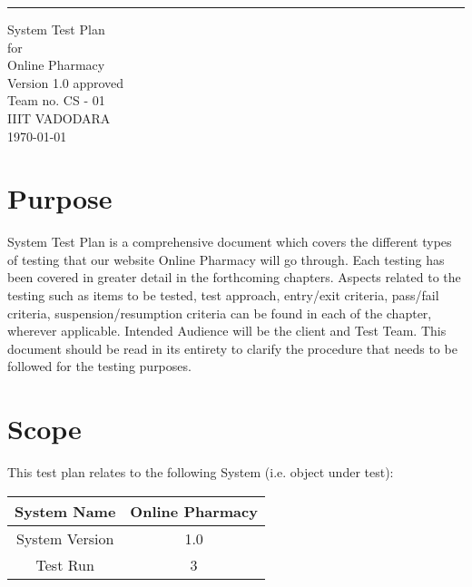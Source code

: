 \documentclass{article}
\date{}
\def\myversion{1.0 }
\begin{document}
\begin{center}
    \rule{16cm}{5pt}\vskip1cm
    \begin{bfseries}
        \Huge{System Test Plan}\\
        \vspace{1.9cm}
        for\\
        \vspace{1.9cm}
         Online Pharmacy\\
        \vspace{1.9cm}
        \LARGE{Version \myversion approved}\\
        \vspace{1.9cm}
        Team no. CS - 01\\
        \vspace{1.9cm}
        IIIT VADODARA\\
        \vspace{1.9cm}
        \today\\
    \end{bfseries}
\end{center}

\tableofcontents
\newpage


\section{Purpose}
System Test Plan is a comprehensive document which covers the different types of testing that our website Online Pharmacy will go through. Each testing has been covered in greater detail in the forthcoming chapters. Aspects related to the testing such as items to be tested, test approach, entry/exit criteria, pass/fail criteria, suspension/resumption criteria can be found in each of the chapter, wherever applicable. Intended Audience will be the client and Test Team. This document should be read in its entirety to clarify the procedure that needs to be followed for the testing purposes.

\section{Scope}
This test plan relates to the following System (i.e. object under test):
\begin{flushleft}
    \begin{tabular}{|c|c|}
        \hline
	    System Name & Online Pharmacy\\
        \hline
	    System Version & 1.0\\
        \hline
	    Test Run & 3\\
        \hline
    \end{tabular}
\end{flushleft}
\end{document}
